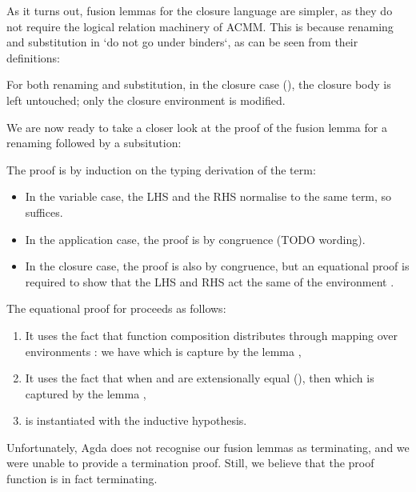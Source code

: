 \documentclass[bsc,frontabs,twoside,singlespacing,parskip,deptreport]{infthesis}
\theoremstyle{definition}
\begin{document}
As it turns out, fusion lemmas for the closure language are simpler,
as they do not require the logical relation machinery of ACMM. This is
because renaming and substitution in \lcl `do not go under binders`,
as can be seen from their definitions:


For both renaming and substitution, in the closure case (), the
closure body is left untouched; only the closure environment is
modified.

We are now ready to take a closer look at the proof of the fusion
lemma for a renaming followed by a subsitution:


The proof is by induction on the typing derivation of the term:

\begin{itemize}
\item In the variable case, the LHS and the RHS normalise to the same
  term, so  suffices.
\item In the application case, the proof is by congruence (TODO
  wording).
\item In the closure case, the proof is also by congruence, but
  an equational proof is required to show that the LHS and RHS act the
  same of the environment .
\end{itemize}

The equational proof for  proceeds as follows:

\begin{enumerate}
\item It uses the fact that function composition 
  distributes through mapping over environments \AS{\_<\$>\_}: we have
   which is capture by the lemma
  ,
\item It uses the fact that when  and  are extensionally
  equal (), then  which
  is captured by the lemma ,
\item {} is instantiated with the inductive hypothesis.
\end{enumerate}

Unfortunately, Agda does not recognise our fusion lemmas as
terminating, and we were unable to provide a termination proof. Still,
we believe that the proof function is in fact terminating.
\end{document}
